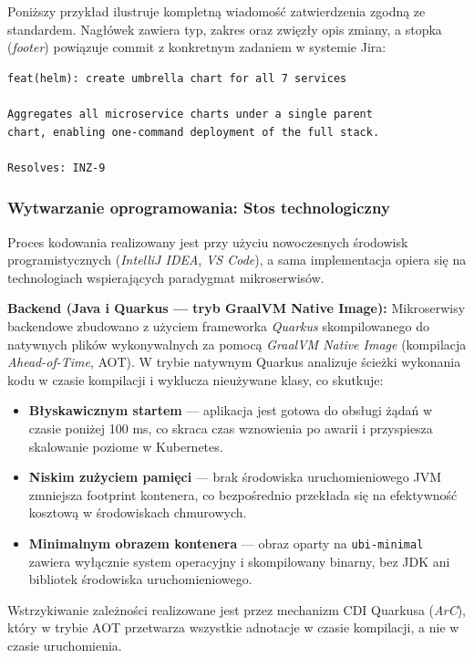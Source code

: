 Poniższy przykład ilustruje kompletną wiadomość zatwierdzenia zgodną ze standardem. Nagłówek zawiera typ, zakres oraz zwięzły opis zmiany, a stopka (\textit{footer}) powiązuje commit z konkretnym zadaniem w systemie Jira:

\begin{lstlisting}[caption={Przykład wiadomości zatwierdzenia zgodnej ze standardem Conventional Commits}, label={lst:conventional-commit}]
feat(helm): create umbrella chart for all 7 services

Aggregates all microservice charts under a single parent
chart, enabling one-command deployment of the full stack.

Resolves: INZ-9
\end{lstlisting}

\subsubsection{Wytwarzanie oprogramowania: Stos technologiczny}
Proces kodowania realizowany jest przy użyciu nowoczesnych środowisk programistycznych (\textit{IntelliJ IDEA}, \textit{VS Code}), a sama implementacja opiera się na technologiach wspierających paradygmat mikroserwisów.

\textbf{Backend (Java i Quarkus — tryb GraalVM Native Image):}
Mikroserwisy backendowe zbudowano z użyciem frameworka \textit{Quarkus} skompilowanego do natywnych plików wykonywalnych za pomocą \textit{GraalVM Native Image} (kompilacja \textit{Ahead-of-Time}, AOT). W trybie natywnym Quarkus analizuje ścieżki wykonania kodu w czasie kompilacji i wyklucza nieużywane klasy, co skutkuje:
\begin{itemize}
    \item \textbf{Błyskawicznym startem} — aplikacja jest gotowa do obsługi żądań w czasie poniżej 100 ms, co skraca czas wznowienia po awarii i przyspiesza skalowanie poziome w Kubernetes.
    \item \textbf{Niskim zużyciem pamięci} — brak środowiska uruchomieniowego JVM zmniejsza footprint kontenera, co bezpośrednio przekłada się na efektywność kosztową w środowiskach chmurowych.
    \item \textbf{Minimalnym obrazem kontenera} — obraz oparty na \texttt{ubi-minimal} zawiera wyłącznie system operacyjny i skompilowany binarny, bez JDK ani bibliotek środowiska uruchomieniowego.
\end{itemize}
Wstrzykiwanie zależności realizowane jest przez mechanizm CDI Quarkusa (\textit{ArC}), który w trybie AOT przetwarza wszystkie adnotacje w czasie kompilacji, a nie w czasie uruchomienia.

